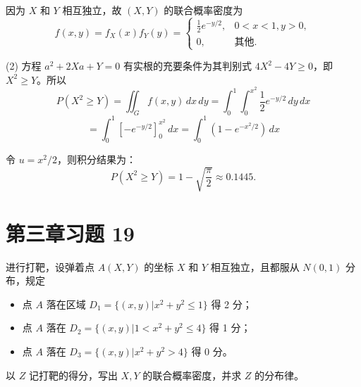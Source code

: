 \documentclass[twoside]{article}
\begin{document}
\begin{ans}{18}{18}
    因为 \( X \) 和 \( Y \) 相互独立，故 \( (X, Y) \) 的联合概率密度为
    \[
    f(x, y) = f_X(x) f_Y(y) = 
    \begin{cases}
    \frac{1}{2} e^{-y/2}, & 0 < x < 1, y > 0, \\
    0, & \text{其他}.
    \end{cases}
    \]
    
    (2) 方程 \( a^2 + 2Xa + Y = 0 \) 有实根的充要条件为其判别式 \( 4X^2 - 4Y \geq 0 \)，即 \( X^2 \geq Y \)。所以
    \[
    P(X^2 \geq Y) = \iint_G f(x, y) \, dx \, dy = \int_0^1 \int_0^{x^2} \frac{1}{2} e^{-y/2} \, dy \, dx
    \]
    \[
    = \int_0^1 \left[ -e^{-y/2} \right]_0^{x^2} \, dx = \int_0^1 \left( 1 - e^{-x^2/2} \right) \, dx
    \]
    
    令 \( u = x^2/2 \)，则积分结果为：
    \[
    P(X^2 \geq Y) = 1 - \sqrt{\frac{\pi}{2}} \approx 0.1445.
    \]
\end{ans}

\section{第三章习题 19}

进行打靶，设弹着点 \( A(X, Y) \) 的坐标 \( X \) 和 \( Y \) 相互独立，且都服从 \( N(0, 1) \) 分布，规定
\begin{itemize}
    \item 点 \( A \) 落在区域 \( D_1 = \{(x, y) | x^2 + y^2 \leq 1\} \) 得 2 分；
    \item 点 \( A \) 落在 \( D_2 = \{(x, y) | 1 < x^2 + y^2 \leq 4\} \) 得 1 分；
    \item 点 \( A \) 落在 \( D_3 = \{(x, y) | x^2 + y^2 > 4\} \) 得 0 分。
\end{itemize}
以 \( Z \) 记打靶的得分，写出 \( X, Y \) 的联合概率密度，并求 \( Z \) 的分布律。
\end{document}
